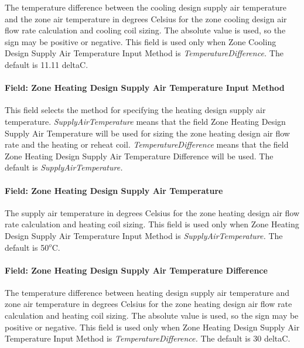 The temperature difference between the cooling design supply air temperature and the zone air temperature in degrees Celsius for the zone cooling design air flow rate calculation and cooling coil sizing. The absolute value is used, so the sign may be positive or negative. This field is used only when Zone Cooling Design Supply Air Temperature Input Method is \emph{TemperatureDifference.} The default is 11.11 deltaC.

\paragraph{Field: Zone Heating Design Supply Air Temperature Input Method}\label{field-zone-heating-design-supply-air-temperature-input-method-7}

This field selects the method for specifying the heating design supply air temperature. \emph{SupplyAirTemperature} means that the field Zone Heating Design Supply Air Temperature will be used for sizing the zone heating design air flow rate and the heating or reheat coil. \emph{TemperatureDifference} means that the field Zone Heating Design Supply Air Temperature Difference will be used. The default is \emph{SupplyAirTemperature.}

\paragraph{Field: Zone Heating Design Supply Air Temperature}\label{field-zone-heating-design-supply-air-temperature-6}

The supply air temperature in degrees Celsius for the zone heating design air flow rate calculation and heating coil sizing. This field is used only when Zone Heating Design Supply Air Temperature Input Method is \emph{SupplyAirTemperature.} The default is 50\(^{o}\)C.

\paragraph{Field: Zone Heating Design Supply Air Temperature Difference}\label{field-zone-heating-design-supply-air-temperature-difference-7}

The temperature difference between heating design supply air temperature and zone air temperature in degrees Celsius for the zone heating design air flow rate calculation and heating coil sizing. The absolute value is used, so the sign may be positive or negative. This field is used only when Zone Heating Design Supply Air Temperature Input Method is \emph{TemperatureDifference.} The default is 30 deltaC.


